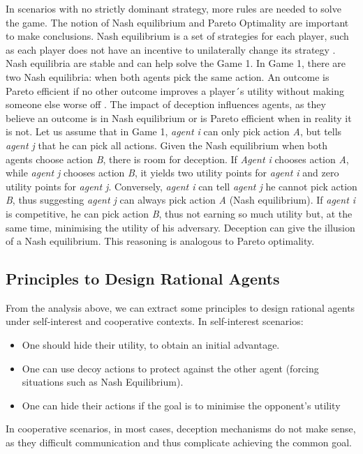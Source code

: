 In scenarios with no strictly dominant strategy, more rules are needed to solve the game. The notion of Nash equilibrium and Pareto Optimality are important to make conclusions. Nash equilibrium is a set of strategies for each player, such as each player does not have an incentive to unilaterally change its strategy \cite{rh}. Nash equilibria are stable and can help solve the Game 1. In Game 1, there are two Nash equilibria: when both agents pick the same action. An outcome is Pareto efficient if no other outcome improves a player´s utility without making someone else worse off \cite{rh}. The impact of deception influences agents, as they believe an outcome is in Nash equilibrium or is Pareto efficient when in reality it is not. Let us assume that in Game 1, \textit{agent i} can only pick action \textit{A}, but tells \textit{agent j} that he can pick all actions. Given the Nash equilibrium when both agents choose action \textit{B}, there is room for deception. If \textit{Agent i} chooses action \textit{A}, while \textit{agent j} chooses action \textit{B}, it yields two utility points for \textit{agent i} and zero utility points for \textit{agent j}.
Conversely, \textit{agent i} can tell \textit{agent j} he cannot pick action \textit{B}, thus suggesting \textit{agent j} can always pick action \textit{A} (Nash equilibrium). If \textit{agent i} is competitive, he can pick action \textit{B}, thus not earning so much utility but, at the same time, minimising the utility of his adversary. Deception can give the illusion of a Nash equilibrium. This reasoning is analogous to Pareto optimality. 

\subsection{Principles to Design Rational Agents}
From the analysis above, we can extract some principles to design rational agents under self-interest and cooperative contexts.
In self-interest scenarios:
\begin{itemize}
    \item One should hide their utility, to obtain an initial advantage.
    \item One can use decoy actions to protect against the other agent (forcing situations such as Nash Equilibrium).
    \item One can hide their actions if the goal is to minimise the opponent's utility
\end{itemize}
In cooperative scenarios, in most cases, deception mechanisms do not make sense, as they difficult communication and thus complicate achieving the common goal.

